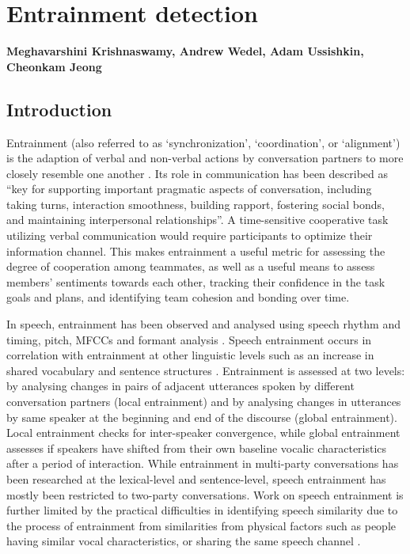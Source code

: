 \chapter{Entrainment detection}
\label{ch:entrainment}

\textbf{Meghavarshini Krishnaswamy, Andrew Wedel, Adam Ussishkin, Cheonkam Jeong} 

\section{Introduction}

    Entrainment (also referred to as `synchronization', `coordination', or
    `alignment') is the adaption of verbal and non-verbal actions by
    conversation partners to more closely resemble one another
    \parencite{borrie2014}. Its role in communication has been described as
    ``key for supporting important pragmatic aspects of conversation, including
    taking turns, interaction smoothness, building rapport, fostering social
    bonds, and maintaining interpersonal relationships''\parencite{borrie2019}.
    A time-sensitive cooperative task utilizing verbal communication would
    require participants to optimize their information channel. This makes
    entrainment a useful metric for assessing the degree of cooperation among
    teammates, as well as a useful means to assess members' sentiments towards
    each other, tracking their confidence in the task goals and plans, and
    identifying team cohesion and bonding over time.

    In speech, entrainment has been observed and analysed using speech rhythm
    and timing, pitch, MFCCs and formant analysis
    \parencite{reichel2018prosodic,borrie2019syncing}. Speech entrainment
    occurs in correlation with entrainment at other linguistic levels such as
    an increase in shared vocabulary and sentence structures
    \parencite{rahimi2017entrainment}. Entrainment is assessed at two levels:
    by analysing changes in pairs of adjacent utterances spoken by different
    conversation partners (local entrainment) and by analysing changes in
    utterances by same speaker at the beginning and end of the discourse
    (global entrainment). Local entrainment checks for inter-speaker
    convergence, while global entrainment assesses if speakers have shifted
    from their own baseline vocalic characteristics after a period of
    interaction. While entrainment in multi-party conversations has been
    researched at the lexical-level and sentence-level, speech entrainment has
    mostly been restricted to two-party conversations. Work on speech
    entrainment is further limited by the practical difficulties in identifying
    speech similarity due to the process of entrainment from similarities from
    physical factors such as people having similar vocal characteristics, or
    sharing the same speech channel \parencite{nasir2020}.
    
